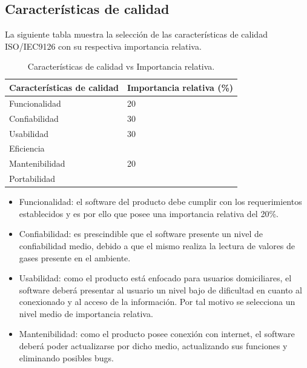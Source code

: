 \documentclass[11pt]{article}
\begin{document}
\subsection{Características de calidad}
La siguiente tabla muestra la selección de las características de calidad
ISO/IEC9126 con su respectiva importancia relativa.
\FloatBarrier
\begin{table}[ht]
    \centering
    \begin{tabular}{|l|l|}\hline \hline
        \rowcolor[HTML]{d6c6c3}
        \bf Características de calidad & \bf Importancia relativa (\%) \\
        \hline
        \hline
        Funcionalidad                  & 20                            \\
        Confiabilidad                  & 30                            \\
        Usabilidad                     & 30                            \\
        Eficiencia                     &                               \\
        Mantenibilidad                 & 20                            \\
        Portabilidad                   &                               \\
        \hline
    \end{tabular}
    \caption{Características de calidad vs Importancia relativa.}
\end{table}
\begin{itemize}
    \item Funcionalidad: el software del producto debe cumplir con los
          requerimientos establecidos y es por ello que posee una importancia
          relativa
          del 20\%.

    \item Confiabilidad: es prescindible que el software presente un nivel de
          confiabilidad medio, debido a que el mismo realiza la lectura de
          valores de
          gases presente en el ambiente.
    \item Usabilidad: como el producto está enfocado para usuarios
          domiciliares, el software deberá presentar al usuario un nivel bajo
          de
          dificultad en cuanto al conexionado y al acceso de la información.
          Por tal
          motivo se selecciona un nivel medio de importancia relativa.
    \item Mantenibilidad: como el producto posee conexión con internet, el
          software deberá poder actualizarse por dicho medio, actualizando sus
          funciones
          y eliminando posibles bugs.
\end{itemize}
\end{document}

